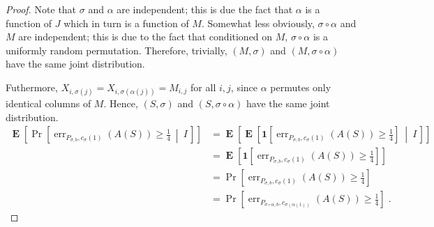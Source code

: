 \documentclass[12pt]{article}
\newcommand{\indicator}[1]{\mathbf{1}\left[{#1}\right]}
\DeclareMathOperator{\err}{err}
\DeclareMathOperator{\Exp}{\mathbf{E}}
\begin{document}
\begin{proof}
Note that $\sigma$ and $\alpha$ are independent; this is due the fact that
$\alpha$ is a function of $J$ which in turn is a function of $M$. Somewhat less
obviously, $\sigma \circ \alpha$ and $M$ are independent; this is due to the
fact that conditioned on $M$, $\sigma \circ \alpha$ is a uniformly random
permutation. Therefore, trivially, $(M,\sigma)$ and $(M, \sigma \circ \alpha)$
have the same joint distribution.

Futhermore, $X_{i,\sigma(j)} = X_{i,\sigma(\alpha(j))} = M_{i,j}$ for all
$i,j$, since $\alpha$ permutes only identical columns of $M$. Hence,
$(S,\sigma)$ and $(S,\sigma \circ \alpha)$ have the same joint distribution.
\begin{align*}
\Exp \left[ \Pr \left[\err_{P_{\sigma, b},c_\sigma(1)}(A(S)) \ge \frac{1}{4} \ \middle| \ I \, \right] \right]
& = \Exp \left[ \Exp \left[ \indicator{ \err_{P_{\sigma, b},c_\sigma(1)}(A(S)) \ge \frac{1}{4}} \ \middle| \ I \, \right] \right] \\
& = \Exp \left[ \indicator{ \err_{P_{\sigma,b},c_\sigma(1)}(A(S)) \ge \frac{1}{4}} \right] \\
& = \Pr \left[ \err_{P_{\sigma, b},c_\sigma(1)}(A(S)) \ge \frac{1}{4} \right] \\
& = \Pr \left[ \err_{P_{\sigma \circ \alpha, b},c_{\sigma(\alpha(1))}}(A(S)) \ge \frac{1}{4} \right] \; .
\end{align*}


\end{proof}
\end{document}
